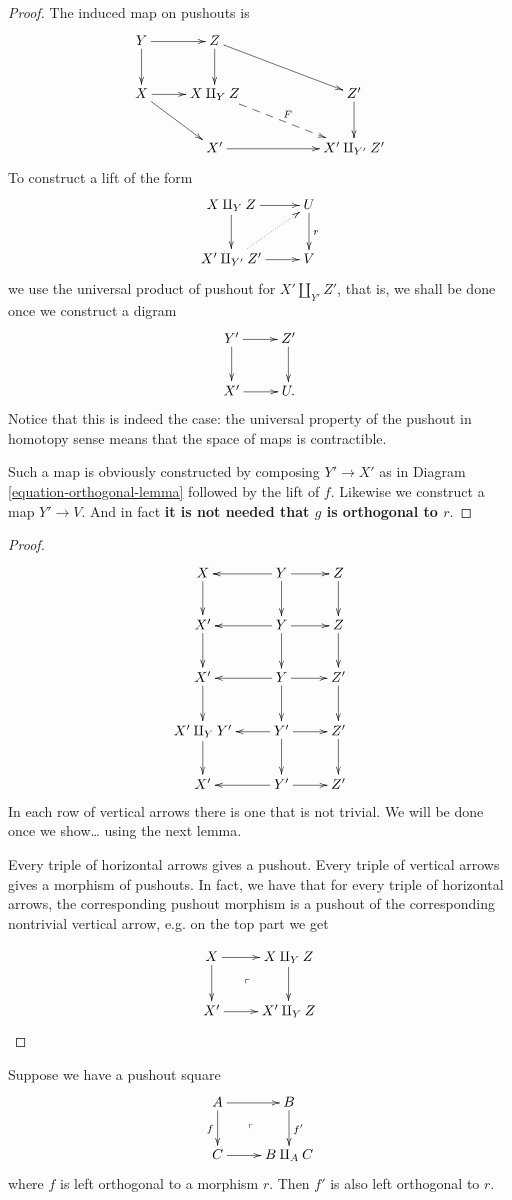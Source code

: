 \begin{proof}
The induced map on pushouts is
$$
\xymatrix{
Y \ar[r] \ar[d] & Z \ar[d] \ar[rrd] & & \\
X \ar[r] \ar[rd]& X \amalg_Y Z \ar@{-->}[rrd]^F & & Z'\ar[d] \\
&X'\ar[rr]& & X' \amalg_{Y'}Z'
}
$$
To construct a lift of the form
$$
\xymatrix{
X \amalg_Y Z\ar[r]\ar[d]&U\ar[d]^r\\
X' \amalg_{Y'}Z'\ar[r]\ar@{.>}[ur]&V
}
$$
we use the universal product of pushout for $X' \amalg_{Y'}Z'$,
that is, we shall be done once we construct a digram
$$
\xymatrix{
Y'\ar[r]\ar[d]&Z'\ar[d]\\
X'\ar[r]&U.
}
$$
Notice that this is indeed the case:
the universal property of the pushout
in homotopy sense means that the space of maps
is contractible.

Such a map is obviously constructed by
composing $Y' \to X'$ as in Diagram \ref{equation-orthogonal-lemma}
followed by the lift of $f$. Likewise
we construct a map  $Y'\to V$.
And in fact
{\bf it is not needed that $g$ is orthogonal to $r$}.
\end{proof}

\begin{proof}
$$
\xymatrix{
X\ar[d]&Y \ar[l]\ar[d]\ar[r]&Z\ar[d]\\
X'\ar[d]&  Y \ar[l]\ar[d]\ar[r]&Z\ar[d]\\
X' \ar[d]&  Y \ar[l]\ar[d]\ar[r]& Z'\ar[d]\\
X'\amalg_Y Y'\ar[d]&  Y'\ar[l]\ar[d]\ar[r]& Z'\ar[d]\\
X'& Y'\ar[l]\ar[r]&Z'
}
$$
In each row of vertical arrows there is one that
is not trivial. We will be done once we show… using
the next lemma.

Every triple of horizontal arrows gives a pushout.
Every triple of vertical arrows gives a morphism of pushouts.
In fact, we have that for every triple
of horizontal arrows, the corresponding pushout
morphism is a pushout of the corresponding nontrivial
vertical arrow, e.g. on the top part we get

$$
\xymatrix{
X\ar[r]\ar[d]\ar@{}[dr]|-{\ulcorner}&X \amalg_YZ\ar[d]\\
X'\ar[r]&X'\amalg_YZ
}
$$

\end{proof}

\begin{lemma}
\label{lemma-orthogonal-lemma2}
Suppose we have a pushout square
$$
\xymatrix{
A\ar[r]\ar[d]_f\ar@{}[dr]|-{\ulcorner}&B\ar[d]^{f'}\\
C\ar[r]&B \amalg_A C
}
$$
where $f$ is left orthogonal to a morphism $r$.
Then $f'$ is also left orthogonal to $r$.
\end{lemma}

